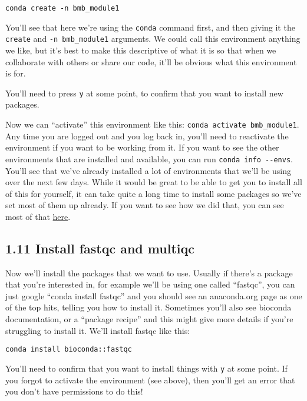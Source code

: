 \documentclass[
]{book}
\begin{document}
\begin{verbatim}
conda create -n bmb_module1
\end{verbatim}

You'll see that here we're using the \texttt{conda} command first, and then giving it the \texttt{create} and \texttt{-n\ bmb\_module1} arguments. We could call this environment anything we like, but it's best to make this descriptive of what it is so that when we collaborate with others or share our code, it'll be obvious what this environment is for.

You'll need to press \texttt{y} at some point, to confirm that you want to install new packages.

Now we can ``activate'' this environment like this: \texttt{conda\ activate\ bmb\_module1}.
Any time you are logged out and you log back in, you'll need to reactivate the environment if you want to be working from it. If you want to see the other environments that are installed and available, you can run \texttt{conda\ info\ -\/-envs}. You'll see that we've already installed a lot of environments that we'll be using over the next few days. While it would be great to be able to get you to install all of this for yourself, it can take quite a long time to install some packages so we've set most of them up already. If you want to see how we did that, you can see most of that \href{https://github.com/LangilleLab/microbiome_helper/wiki/CBW-2024:-Initial-setup-of-environments}{here}.

\subsection{1.11 Install fastqc and multiqc}\label{install-fastqc-and-multiqc}

Now we'll install the packages that we want to use. Usually if there's a package that you're interested in, for example we'll be using one called ``fastqc'', you can just google ``conda install fastqc'' and you should see an anaconda.org page as one of the top hits, telling you how to install it. Sometimes you'll also see bioconda documentation, or a ``package recipe'' and this might give more details if you're struggling to install it. We'll install fastqc like this:

\begin{verbatim}
conda install bioconda::fastqc
\end{verbatim}

You'll need to confirm that you want to install things with \texttt{y} at some point. If you forgot to activate the environment (see above), then you'll get an error that you don't have permissions to do this!
\end{document}
